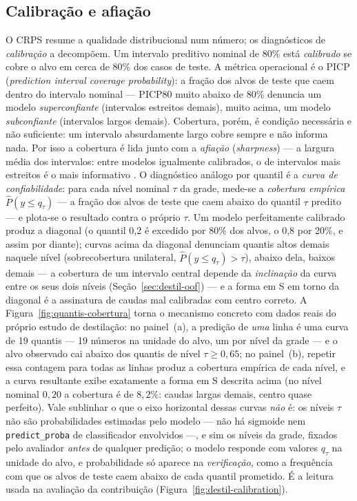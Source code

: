 \subsection{Calibração e afiação}

O CRPS resume a qualidade distribucional num número; os diagnósticos de
\emph{calibração} a decompõem. Um intervalo preditivo nominal de 80\% está
\emph{calibrado} se cobre o alvo em cerca de 80\% dos casos de teste. A
métrica operacional é o PICP (\emph{prediction interval coverage
probability}): a fração dos alvos de teste que caem dentro do intervalo
nominal --- PICP80 muito abaixo de 80\% denuncia um modelo
\emph{superconfiante} (intervalos estreitos demais), muito acima, um modelo
\emph{subconfiante} (intervalos largos demais). Cobertura, porém, é
condição necessária e não suficiente: um intervalo absurdamente largo cobre
sempre e não informa nada. Por isso a cobertura é lida junto com a
\emph{afiação} (\emph{sharpness}) --- a largura média dos intervalos: entre
modelos igualmente calibrados, o de intervalos mais estreitos é o mais
informativo \citep{gneiting2007calib}. O diagnóstico análogo por quantil é
a \emph{curva de confiabilidade}: para cada nível nominal $\tau$ da grade,
mede-se a \emph{cobertura empírica} $\hat P(y \leq q_\tau)$ --- a fração
dos alvos de teste que caem abaixo do quantil $\tau$ predito --- e
plota-se o resultado contra o próprio $\tau$. Um modelo perfeitamente
calibrado produz a diagonal (o quantil 0,2 é excedido por 80\% dos alvos,
o 0,8 por 20\%, e assim por diante); curvas acima da diagonal denunciam
quantis altos demais naquele nível (sobrecobertura unilateral,
$\hat P(y\le q_\tau)>\tau$), abaixo dela, baixos demais --- a
cobertura de um intervalo central depende da \emph{inclinação} da
curva entre os seus dois níveis
(Seção~\ref{sec:destil-oof}) --- e a
forma em S em torno da diagonal é a assinatura de caudas mal calibradas
com centro correto. A Figura~\ref{fig:quantis-cobertura} torna o
mecanismo concreto com dados reais do próprio estudo de destilação: no
painel~(a), a predição de \emph{uma} linha é uma curva de 19 quantis ---
19 números na unidade do alvo, um por nível da grade --- e o alvo
observado cai abaixo dos quantis de nível $\tau \geq 0{,}65$; no
painel~(b), repetir essa contagem para todas as linhas produz a
cobertura empírica de cada nível, e a curva resultante exibe exatamente
a forma em S descrita acima (no nível nominal $0{,}20$ a cobertura é de
$8{,}2\%$: caudas largas demais, centro quase perfeito). Vale sublinhar
o que o eixo horizontal dessas curvas \emph{não} é: os níveis $\tau$
não são probabilidades estimadas pelo modelo --- não há sigmoide nem
\texttt{predict\_proba} de classificador envolvidos ---, e sim os
níveis da grade, fixados pelo avaliador \emph{antes} de qualquer
predição; o modelo responde com valores $q_\tau$ na unidade do alvo, e
probabilidade só aparece na \emph{verificação}, como a frequência com
que os alvos de teste caem abaixo de cada quantil prometido. É a
leitura usada na avaliação da contribuição
(Figura~\ref{fig:destil-calibration}).

